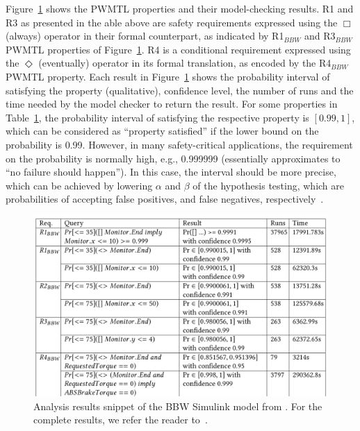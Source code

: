 Figure~\ref{fig_smcresult} shows the PWMTL properties and their model-checking results. R1 and R3 as presented in the able above  are safety requirements expressed using the $\Box$ (always) operator in their formal counterpart, as indicated by R1$_{BBW}$ and R3$_{BBW}$ PWMTL properties of Figure~\ref{fig_smcresult}. R4 is a conditional requirement expressed using the $\Diamond$ (eventually) operator in its formal translation, as encoded by the R4$_{BBW}$ PWMTL property. Each result in Figure~\ref{fig_smcresult} shows the probability interval of satisfying the property (qualitative), confidence level, the number of runs and the time needed by the model checker to return the result. For some properties in Table~\ref{fig_smcresult}, the probability interval of satisfying the respective property is $[0.99, 1]$, which can be considered as ``property satisfied'' if the lower bound on the probability is 0.99. However, in many safety-critical applications, the requirement on the probability is normally high, e.g., 0.999999 (essentially approximates to ``no failure should happen''). In this case, the interval should be more precise, which can be achieved by lowering $\alpha$ and $\beta$ of the hypothesis testing, which are probabilities of accepting false positives, and false negatives, respectively~\cite{David2011StatisticalAutomata}.
\begin{figure}
	\centering
	\includegraphics[width=1\linewidth]{images/smc_result}
	\caption{Analysis results snippet of the BBW Simulink model from \uppaalsmc{}. For the complete results, we refer the reader to~\cite{Filipovikj2018SimppaalModels}.}
	\label{fig_smcresult}\vspace{-0.2cm}
\end{figure}

